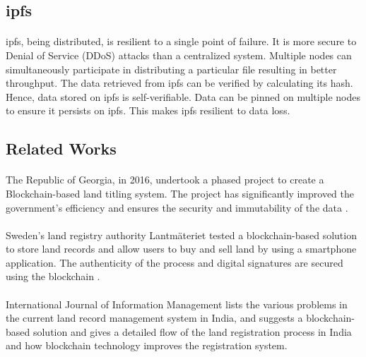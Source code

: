 \documentclass[12pt]{article}
\begin{document}
    \subsection{\acrshort{ipfs}}
        \paragraph{}
        \acrshort{ipfs}, being distributed, is resilient to a single point of failure. It is more secure to Denial of Service (DDoS) attacks than a centralized system. Multiple nodes can simultaneously participate in distributing a particular file resulting in better throughput. The data retrieved from \acrshort{ipfs} can be verified by calculating its hash. Hence, data stored on \acrshort{ipfs} is self-verifiable. Data can be pinned on multiple nodes to ensure it persists on \acrshort{ipfs}. This makes \acrshort{ipfs} resilient to data loss.

    \subsection{Related Works}
        \paragraph{}
        The Republic of Georgia, in 2016, undertook a phased project to create a Blockchain-based land titling system. The project has significantly improved the government’s efficiency and ensures the security and immutability of the data \cite{10.1162/inov_a_00276}.

        \paragraph{}
        Sweden’s land registry authority Lantmäteriet tested a blockchain-based solution to store land records and allow users to buy and sell land by using a smartphone application. The authenticity of the process and digital signatures are secured using the blockchain \cite{sweden}.
        
        \paragraph{}
        International Journal of Information Management \cite{THAKUR2020101940} lists the various problems in the current land record management system in India, and suggests a blockchain-based solution and gives a detailed flow of the land registration process in India and how blockchain technology improves the registration system.
\end{document}
